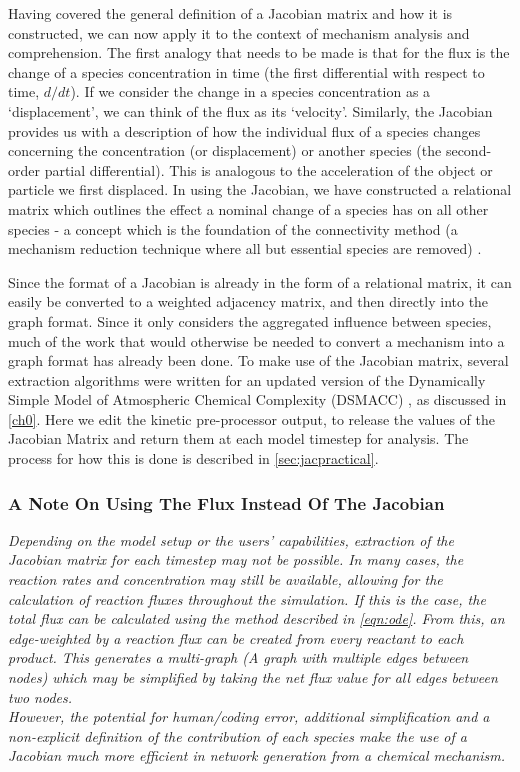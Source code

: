 Having covered the general definition of a Jacobian matrix and how it is constructed, we can now apply it to the context of mechanism analysis and comprehension. The first analogy that needs to be made is that for the flux is the change of a species concentration in time (the first differential with respect to time, $d/dt$). If we consider the change in a species concentration as a `displacement', we can think of the flux as its `velocity'.
Similarly, the Jacobian provides us with a description of how the individual flux of a species changes concerning the concentration (or displacement) or another species (the second-order partial differential). This is analogous to the acceleration of the object or particle we first displaced. In using the Jacobian, we have constructed a relational matrix which outlines the effect a nominal change of a species has on all other species - a concept which is the foundation of the connectivity method (a mechanism reduction technique where all but essential species are removed) \citep{connectivity}.

Since the format of a Jacobian is already in the form of a relational matrix, it can easily be converted to a weighted adjacency matrix, and then directly into the graph format. Since it only considers the aggregated influence between species, much of the work that would otherwise be needed to convert a mechanism into a graph format has already been done. To make use of the Jacobian matrix, several extraction algorithms were written for an updated version of the Dynamically Simple Model of Atmospheric Chemical Complexity (DSMACC) \citep{dsmacc,dsmaccgit}, as discussed in \autoref{ch0}. Here we edit the kinetic pre-processor output, \citep{kpp} to release the values of the Jacobian Matrix and return them at each model timestep for analysis. The process for how this is done is described in \autoref{sec:jacpractical}.



\subsubsection*{ A Note On Using The Flux Instead Of The Jacobian }
\textit{
Depending on the model setup or the users' capabilities, extraction of the Jacobian matrix for each timestep may not be possible. In many cases, the reaction rates and concentration may still be available, allowing for the calculation of reaction fluxes throughout the simulation. If this is the case, the total flux can be calculated using the method described in  \autoref{eqn:ode}. From this, an edge-weighted by a reaction flux can be created from every reactant to each product. This generates a multi-graph (A graph with multiple edges between nodes) which may be simplified by taking the net flux value for all edges between two nodes. \\
However, the potential for human/coding error, additional simplification and a non-explicit definition of the contribution of each species make the use of a Jacobian much more efficient in network generation from a chemical mechanism.
}

